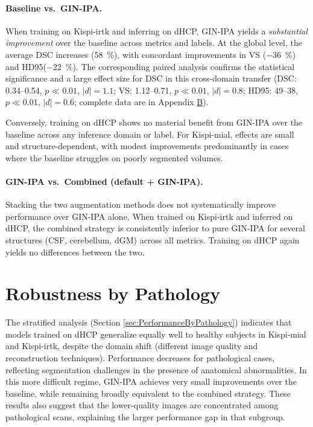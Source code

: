 \paragraph{Baseline vs.\ GIN-IPA.}
When training on Kispi-irtk and inferring on dHCP, GIN-IPA yields a \emph{substantial improvement} over the baseline across metrics and labels. At the global level, the average DSC increases (\qty{+58}{\percent}), with concordant improvements in VS (\qty{-36}{\percent}) and HD95(\qty{-22}{\percent}). The corresponding paired analysis confirms the statistical significance and a large effect size for DSC in this cross-domain transfer (DSC: \numrange[range-open-phrase=from\ ]{0.34}{0.54}, $p \ll 0.01$, $|d|=1.1$; VS: \numrange[range-open-phrase=from\ ]{1.12}{0.71}, $p\ll 0.01$, $|d|=0.8$; HD95: \numrange[range-open-phrase=from\ ]{49}{38}, $p\ll 0.01$, $|d|=0.6$; complete data are in Appendix \hyperref[app:SupplementaryTables]{B}).

Conversely, training on dHCP shows no material benefit from GIN-IPA over the baseline across any inference domain or label. For Kispi-mial, effects are small and structure-dependent, with modest improvements predominantly in cases where the baseline struggles on poorly segmented volumes.

\paragraph{GIN-IPA vs.\ Combined (default + GIN-IPA).}
Stacking the two augmentation methods does not systematically improve performance over GIN-IPA alone. When trained on Kispi-irtk and inferred on dHCP, the combined strategy is consistently inferior to pure GIN-IPA for several structures (CSF, cerebellum, dGM) across all metrics. Training on dHCP again yields no differences between the two.

\section{Robustness by Pathology}
The stratified analysis (Section \ref{sec:PerformanceByPathology}) indicates that models trained on dHCP generalize equally well to healthy subjects in Kispi-mial and Kispi-irtk, despite the domain shift (different image quality and reconstruction techniques). Performance decreases for pathological cases, reflecting segmentation challenges in the presence of anatomical abnormalities. In this more difficult regime, GIN-IPA achieves very small improvements over the baseline, while remaining broadly equivalent to the combined strategy. These results also suggest that the lower-quality images are concentrated among pathological scans, explaining the larger performance gap in that subgroup.

